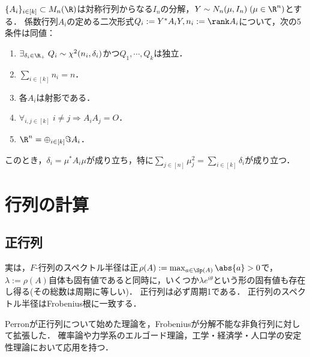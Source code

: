 \documentclass[uplatex, dvipdfmx]{jsreport}
\begin{document}
\begin{theorem}
    $\{A_i\}_{i\in[k]}\subset M_n(\R)$は対称行列からなる$I_n$の分解，$Y\sim N_n(\mu,I_n)\;(\mu\in\R^n)$とする．
    係数行列$A_i$の定める二次形式$Q_i:=Y^*A_iY,n_i:=\rank A_i$について，次の5条件は同値：
    \begin{enumerate}
        \item $\exists_{\delta_i\in\R_+}\;Q_i\sim\chi^2(n_i,\delta_i)$かつ$Q_1,\cdots,Q_k$は独立．
        \item $\sum_{i\in[k]}n_i=n$．
        \item 各$A_i$は射影である．
        \item $\forall_{i,j\in[k]}\;i\ne j\Rightarrow A_iA_j=O$．
        \item $\R^n=\oplus_{i\in[k]}\Im A_i$．
    \end{enumerate}
    このとき，$\delta_i=\mu^*A_i\mu$が成り立ち，特に$\sum_{j\in[n]}\mu_j^2=\sum_{i\in[k]}\delta_i$が成り立つ．
\end{theorem}

\section{行列の計算}

\subsection{正行列}

\begin{tcolorbox}[colframe=ForestGreen, colback=ForestGreen!10!white,breakable,colbacktitle=ForestGreen!40!white,coltitle=black,fonttitle=\bfseries\sffamily,
title=]
    実は，$F$-行列のスペクトル半径は正$\rho(A):=\max_{a\in\Sp(A)}\abs{a}>0$で，$\lambda:=\rho(A)$自体も固有値であると同時に，いくつか$\lambda e^{i\theta}$という形の固有値も存在し得る(その総数は周期に等しい)．
    正行列は必ず周期1である．
    正行列のスペクトル半径はFrobenius根に一致する．
\end{tcolorbox}

\begin{remarks}[正行列]
    Perronが正行列について始めた理論を，Frobeniusが分解不能な非負行列に対して拡張した．
    確率論や力学系のエルゴード理論，工学・経済学・人口学の安定性理論において応用を持つ．
\end{remarks}
\end{document}
